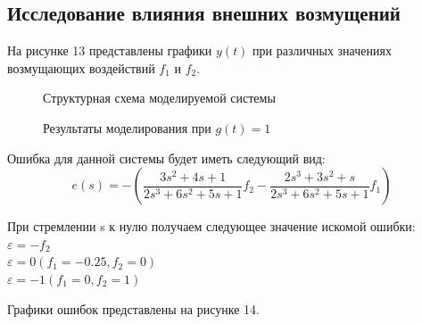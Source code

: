 \documentclass[a4paper, 11pt]{article}
\begin{document}
\newpage
\begin{center}
\section{Исследование влияния внешних возмущений}
\end{center}

\par
На рисунке 13 представлены графики $y(t)$ при различных значениях возмущающих воздействий $f_1$ и $f_2$.
\begin{figure}[h]
\caption{Структурная схема моделируемой системы}
\label{ris:image}
\end{figure}

\begin{figure}[h!]
\centering
{}
\caption{Результаты моделирования при $g(t)=1$}
\end{figure}

Ошибка для данной системы будет иметь следующий вид:
\begin{equation}
e(s)=-\left(\frac{3s^2+4s+1}{2s^3+6s^2+5s+1}f_2-\frac{2s^3+3s^2+s}{2s^3+6s^2+5s+1}f_1\right)
\end{equation}
\par
При стремлении s к нулю получаем следующее значение искомой ошибки:\\
$\varepsilon=-f_2$\\
$\varepsilon=0(f_1=-0.25, f_2=0)$\\
$\varepsilon=-1(f_1=0, f_2=1)$
\par
Графики ошибок представлены на рисунке 14.
\end{document}

